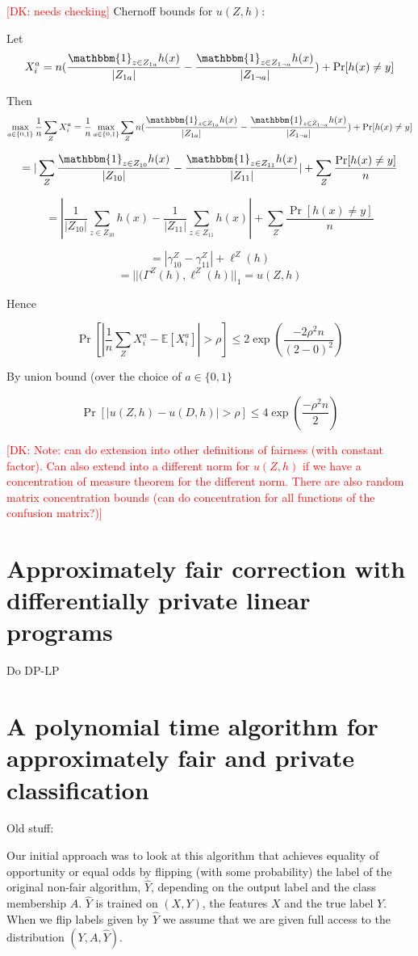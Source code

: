 \documentclass[runningheads]{article}
\newcommand{\dk}[1]{\textcolor{red}{[DK: #1]}}
\newcommand{\1}{\mathbbm{1}}
\theoremstyle{definition}
\begin{document}
\dk {needs checking}
Chernoff bounds for $u(Z,h)$:

Let $$X_i^a = n(\frac{\1_{z\in Z_{1a}}h(x)}{|Z_{1a}|} - \frac{\1_{z\in Z_{1\neg a}}h(x)}{|Z_{1 \neg a}|} ) + \Pr[h(x) \neq y]$$

Then $$\max_{a\in \{0,1\}}\frac{1}{n} \sum_Z X_i^a =\frac{1}{n}  \max_{a\in \{0,1\}} \sum_Z n(\frac{\1_{z\in Z_{1a}}h(x)}{|Z_{1a}|} - \frac{\1_{z\in Z_{1\neg a}}h(x)}{|Z_{1 \neg a}|} ) + \Pr[h(x) \neq y]$$

$$= |\sum_Z \frac{\1_{z\in Z_{10}}h(x)}{|Z_{10}|} - \frac{\1_{z\in Z_{11}}h(x)}{|Z_{11}|}| +  \sum_Z \frac{\Pr[h(x) \neq y] }{n}$$

$$= |\frac{1}{|Z_{10}|} \sum_{z\in Z_{10}} h(x) - \frac{1}{|Z_{11}|} \sum_{z\in Z_{11}} h(x)| +  \sum_Z \frac{\Pr[h(x) \neq y] }{n}$$

$$=|\gamma_{10}^Z - \gamma_{11}^Z| + \ell^Z(h) $$
$$=||(\Gamma^Z(h), \ell^Z(h)||_{1} = u(Z,h)$$

Hence

$$\Pr[|\frac{1}{n} \sum_Z X_i^a - \mathbb{E}[X_i^a]| > \rho] \leq 2\exp(\frac{-2\rho^2n}{(2-0)^2})$$

By union bound (over the choice of $a \in \{0,1\}$

$$\Pr[|u(Z,h) - u(D,h)| > \rho] \leq 4\exp(\frac{-\rho^2n}{2})$$

\dk {Note: can do extension into other definitions of fairness (with constant factor).
Can also extend into a different norm for $u(Z,h)$ if we have a concentration of measure theorem for the different norm. There are also random matrix concentration bounds (can do concentration for all functions of the confusion matrix?)}

\section{Approximately fair correction with differentially private linear programs}
Do DP-LP

\section{A polynomial time algorithm for approximately fair and private classification}
\clearpage

Old stuff:

Our initial approach was to look at this algorithm that achieves equality of opportunity or equal odds by flipping (with some probability) the label of the original non-fair algorithm, $\hat{Y}$, depending on the output label and the class membership $A$. $\hat{Y}$ is trained on $(X,Y)$, the features $X$ and the true label $Y$. When we flip labels given by $\hat{Y}$ we assume that we are given full access to the distribution $(Y,A,\hat{Y})$.
\end{document}
